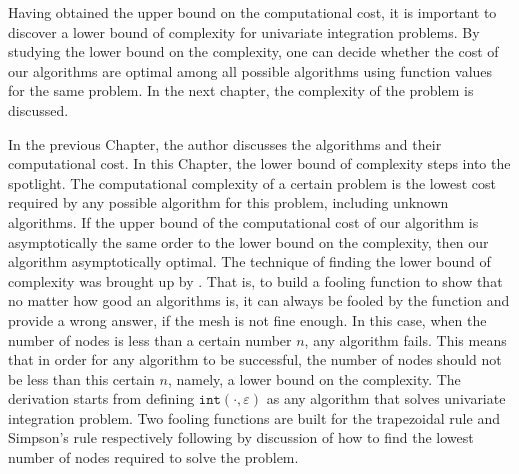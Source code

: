 \documentclass{iitthesis}
\theoremstyle{definition}
\theoremstyle{remark}
\begin{document}
Having obtained the upper bound on the computational cost, it is important to discover a lower bound of complexity for univariate integration problems. By studying the lower bound on the complexity, one can decide whether the cost of our algorithms are optimal among all possible algorithms using function values for the same problem. In the next chapter, the complexity of the problem is discussed.


In the previous Chapter, the author discusses the algorithms and their computational cost. In this Chapter, the lower bound of complexity steps into the spotlight. The computational complexity of a certain problem is the lowest cost required by any possible algorithm for this problem, including unknown algorithms. If the upper bound of the computational cost of our algorithm is asymptotically the same order to the lower bound on the complexity, then our algorithm asymptotically optimal. The technique of finding the lower bound of complexity was brought up by \cite[p.\ 11--12]{TraWer98}. That is, to build a fooling function to show that no matter how good an algorithms is, it can always be fooled by the function and provide a wrong answer, if the mesh is not fine enough. In this case, when the number of nodes is less than a certain number $n$, any algorithm fails. This means that in order for any algorithm to be successful, the number of nodes should not be less than this certain $n$, namely, a lower bound on the complexity. The derivation starts from defining $\texttt{int}(\cdot,\varepsilon)$ as any algorithm that solves univariate integration problem.  Two fooling functions are built for the trapezoidal rule and Simpson's rule respectively following by discussion of how to find the lowest number of nodes required to solve the problem.

\end{document}
